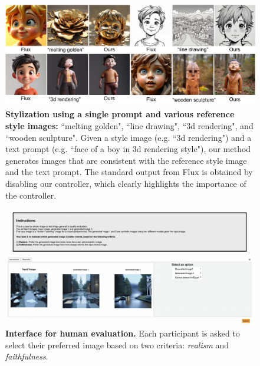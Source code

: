 \documentclass{article} %
\theoremstyle{plain}
\begin{document}
\begin{figure}[!tbh]
\includegraphics[width=\linewidth]{pics/stylization_low.pdf}
\caption{
\textbf{Stylization using a single prompt and various reference style images:} ``melting golden", ``line drawing", ``3d rendering", and ``wooden sculpture".
Given a style image (e.g. ``3d rendering") and a text prompt (e.g. ``face of a boy in 3d rendering style"), our method generates images that are consistent with the reference style image and the text prompt. 
The standard output from Flux is obtained by disabling our controller, which clearly highlights the importance of the controller. 
}
\label{fig:reference-style}
\end{figure}







\begin{figure}[!tbh]
\includegraphics[width=\linewidth]{pics/userstudy_low.pdf}
\caption{
\textbf{Interface for human evaluation.} 
Each participant is asked to select their preferred image based on two criteria: \textit{realism} and \textit{faithfulness}.
}
\label{fig:user-study}
\end{figure}
\end{document}
